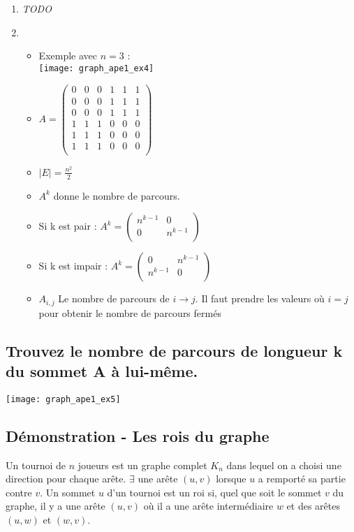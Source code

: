 \begin{solution}
\begin{enumerate}
    \item \emph{TODO}
\item
	\begin{itemize}
	\item Exemple avec $n=3$ :\\
	\texttt{[image: graph\_ape1\_ex4]}
	\item
	 $A = \begin{pmatrix}
	 0&0&0&1&1&1\\
	 0&0&0&1&1&1\\
	 0&0&0&1&1&1\\
	 1&1&1&0&0&0\\
	 1&1&1&0&0&0\\
	 1&1&1&0&0&0\\
	 \end{pmatrix}$

	\item $|E| = \frac{n^{2}}{2}$

	\item $A^{k} $ donne le nombre de parcours.
	\item Si k est pair :
	 $A^{k} =  \left(
	 \begin{array}{c|c}
	 n^{k-1} & 0\\
	 \hline
	 0 & n^{k-1}\\
	 \end{array}
	 \right)
	 $
	\item Si k est impair :
	 $A^{k} =  \left(
	 \begin{array}{c|c}
	 0 & n^{k-1}\\
	 \hline
	 n^{k-1}&0\\
	 \end{array}
	 \right)
	 $
	\item $A_{i,j}$ Le nombre de parcours de $i \rightarrow j$. Il faut prendre les valeurs où $i = j$ pour obtenir le nombre de parcours fermés
\end{itemize}
\end{enumerate}
\end{solution}

\subsection{Trouvez le nombre de parcours de longueur k du sommet A à lui-même.}
\texttt{[image: graph\_ape1\_ex5]}


\subsection{Démonstration - Les rois du graphe}
Un tournoi de $n$ joueurs est un graphe complet $K_{n}$ dans lequel on a choisi une direction pour chaque arête.
$\exists$ une arête $(u,v)$ lorsque $u$ a remporté sa partie contre $v$.
Un sommet $u$ d'un tournoi est un roi si, quel que soit le sommet $v$ du graphe,
il y a une arête $(u,v)$ où il a une arête intermédiaire $w$ et des arêtes $(u,w)$ et $(w,v)$.

